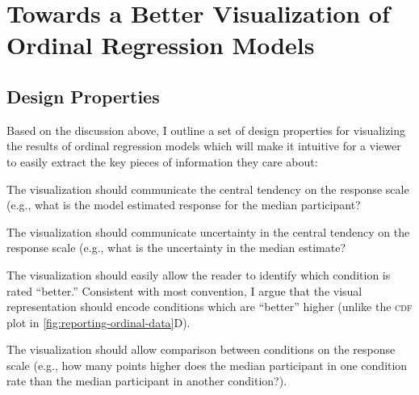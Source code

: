 \documentclass{vgtc}                          %
\newcommand{\customsubsubsection}[1]{%
    \smallskip\noindent%
       \fontfamily{cmss}{\textbf{#1}}%
       \normalfont
}
\begin{document}
\section{Towards a Better Visualization of Ordinal Regression Models}
\label{sec:ccdf}

\subsection{Design Properties}
Based on the discussion above, I outline a set of design properties for visualizing the results of ordinal regression models which will make it intuitive for a viewer to easily extract the key pieces of information they care about:

\customsubsubsection{[D1]} The visualization should communicate the central tendency on the response scale (e.g., what is the model estimated response for the median participant?

\customsubsubsection{[D2]} The visualization should communicate uncertainty in the central tendency on the response scale (e.g., what is the uncertainty in the median estimate?

\customsubsubsection{[D3]} The visualization should easily allow the reader to identify which condition is rated ``better.'' Consistent with most convention, I argue that the visual representation should encode conditions which are ``better'' higher (unlike the \textsc{cdf} plot in \autoref{fig:reporting-ordinal-data}D).

\customsubsubsection{[D4]} The visualization should allow comparison between conditions on the response scale (e.g., how many points higher does the median participant in one condition rate than the median participant in another condition?).

\end{document}
